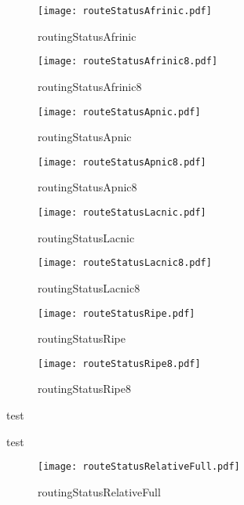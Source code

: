 \documentclass[11pt,a4paper]{scrreprt}
\begin{document}
\begin{figure}[h!]
\centering
\texttt{[image: routeStatusAfrinic.pdf]}
\caption{routingStatusAfrinic}
\label{fig:routingStatusAfrinic}
\end{figure}

\begin{figure}[h!]
\centering
\texttt{[image: routeStatusAfrinic8.pdf]}
\caption{routingStatusAfrinic8}
\label{fig:routingStatusAfrinic8}
\end{figure}

\begin{figure}[h!]
\centering
\texttt{[image: routeStatusApnic.pdf]}
\caption{routingStatusApnic}
\label{fig:routingStatusApnic}
\end{figure}

\begin{figure}[h!]
\centering
\texttt{[image: routeStatusApnic8.pdf]}
\caption{routingStatusApnic8}
\label{fig:routingStatusApnic8}
\end{figure}

\begin{figure}[h!]
\centering
\texttt{[image: routeStatusLacnic.pdf]}
\caption{routingStatusLacnic}
\label{fig:routingStatusLacnic}
\end{figure}

\begin{figure}[h!]
\centering
\texttt{[image: routeStatusLacnic8.pdf]}
\caption{routingStatusLacnic8}
\label{fig:routingStatusLacnic8}
\end{figure}

\begin{figure}[h!]
\centering
\texttt{[image: routeStatusRipe.pdf]}
\caption{routingStatusRipe}
\label{fig:routingStatusRipe}
\end{figure}

\begin{figure}[h!]
\centering
\texttt{[image: routeStatusRipe8.pdf]}
\caption{routingStatusRipe8}
\label{fig:routingStatusRipe8}
\end{figure}

test

test

\begin{figure}[h!]
\centering
\texttt{[image: routeStatusRelativeFull.pdf]}
\caption{routingStatusRelativeFull}
\label{fig:routingStatusRelativeFull}
\end{figure}
\end{document}
